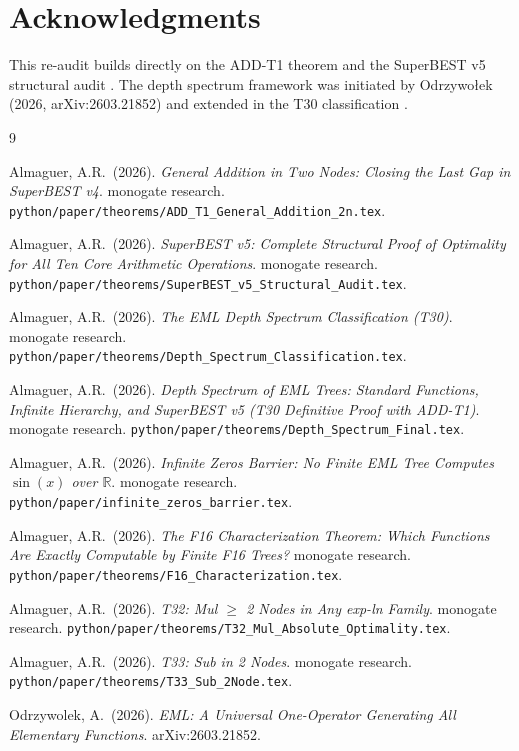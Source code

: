 \documentclass[12pt,a4paper]{article}
\theoremstyle{definition}
\theoremstyle{remark}
\newcommand{\R}{\mathbb{R}}
\begin{document}
\section*{Acknowledgments}

This re-audit builds directly on the ADD-T1 theorem \cite{ADDT1} and the
SuperBEST v5 structural audit \cite{SB5}.  The depth spectrum framework was
initiated by Odrzywołek (2026, arXiv:2603.21852) and extended in the T30
classification \cite{T30}.

\begin{thebibliography}{9}

Almaguer, A.R.\ (2026).
\textit{General Addition in Two Nodes: Closing the Last Gap in SuperBEST v4}.
monogate research.
\texttt{python/paper/theorems/ADD\_T1\_General\_Addition\_2n.tex}.

Almaguer, A.R.\ (2026).
\textit{SuperBEST v5: Complete Structural Proof of Optimality for All Ten
Core Arithmetic Operations}.
monogate research.
\texttt{python/paper/theorems/SuperBEST\_v5\_Structural\_Audit.tex}.

Almaguer, A.R.\ (2026).
\textit{The EML Depth Spectrum Classification (T30)}.
monogate research.
\texttt{python/paper/theorems/Depth\_Spectrum\_Classification.tex}.

Almaguer, A.R.\ (2026).
\textit{Depth Spectrum of EML Trees: Standard Functions, Infinite Hierarchy,
and SuperBEST v5 (T30 Definitive Proof with ADD-T1)}.
monogate research.
\texttt{python/paper/theorems/Depth\_Spectrum\_Final.tex}.

Almaguer, A.R.\ (2026).
\textit{Infinite Zeros Barrier: No Finite EML Tree Computes $\sin(x)$ over $\R$}.
monogate research.
\texttt{python/paper/infinite\_zeros\_barrier.tex}.

Almaguer, A.R.\ (2026).
\textit{The F16 Characterization Theorem: Which Functions Are Exactly
Computable by Finite F16 Trees?}
monogate research.
\texttt{python/paper/theorems/F16\_Characterization.tex}.

Almaguer, A.R.\ (2026).
\textit{T32: Mul $\geq$ 2 Nodes in Any exp-ln Family}.
monogate research.
\texttt{python/paper/theorems/T32\_Mul\_Absolute\_Optimality.tex}.

Almaguer, A.R.\ (2026).
\textit{T33: Sub in 2 Nodes}.
monogate research.
\texttt{python/paper/theorems/T33\_Sub\_2Node.tex}.

Odrzywolek, A.\ (2026).
\textit{EML: A Universal One-Operator Generating All Elementary Functions}.
arXiv:2603.21852.

\end{thebibliography}
\end{document}
